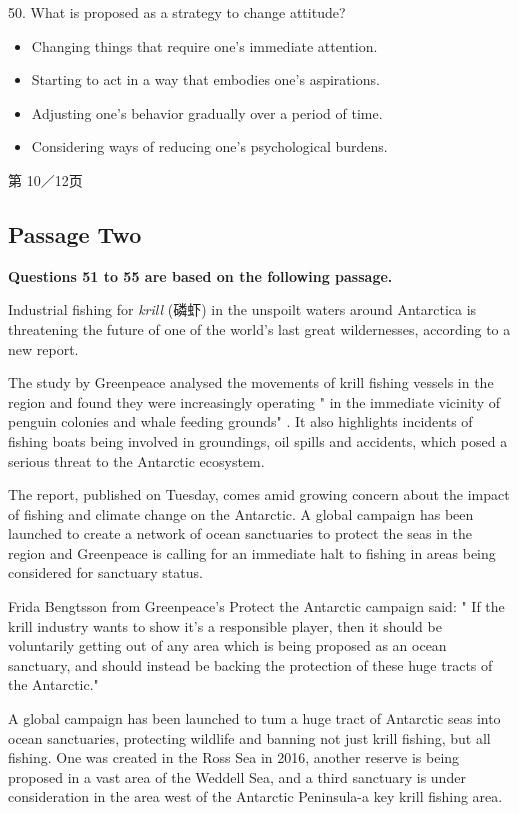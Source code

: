 \documentclass[UTF8,11pt]{ctexart}
\begin{document}
50. What is proposed as a strategy to change attitude?


\begin{itemize}[leftmargin=2em,itemsep=.2em,topsep=.4em]\item[A.] Changing things that require one's immediate attention.
\item[B.] Starting to act in a way that embodies one's aspirations.
\item[C.] Adjusting one's behavior gradually over a period of time.
\item[D.] Considering ways of reducing one's psychological burdens.
\end{itemize}

第 10／12页


\subsection*{\textbf{Passage Two}}


\textbf{Questions 51 to 55 are based on the following passage.}


Industrial fishing for \textit{krill }(磷虾) in the unspoilt waters around Antarctica is threatening the future of one of the world's last great wildernesses, according to a new report.


The study by Greenpeace analysed the movements of krill fishing vessels in the region and found they were increasingly operating " in the immediate vicinity of penguin colonies and whale feeding grounds" . It also highlights incidents of fishing boats being involved in groundings, oil spills and accidents, which posed a serious threat to the Antarctic ecosystem.


The report, published on Tuesday, comes amid growing concern about the impact of fishing and climate change on the Antarctic. A global campaign has been launched to create a network of ocean sanctuaries to protect the seas in the region and Greenpeace is calling for an immediate halt to fishing in areas being considered for sanctuary status.


Frida Bengtsson from Greenpeace's Protect the Antarctic campaign said: " If the krill industry wants to show it's a responsible player, then it should be voluntarily getting out of any area which is being proposed as an ocean sanctuary, and should instead be backing the protection of these huge tracts of the Antarctic."


A global campaign has been launched to tum a huge tract of Antarctic seas into ocean sanctuaries, protecting wildlife and banning not just krill fishing, but all fishing. One was created in the Ross Sea in 2016, another reserve is being proposed in a vast area of the Weddell Sea, and a third sanctuary is under consideration in the area west of the Antarctic Peninsula-a key krill fishing area.
\end{document}
